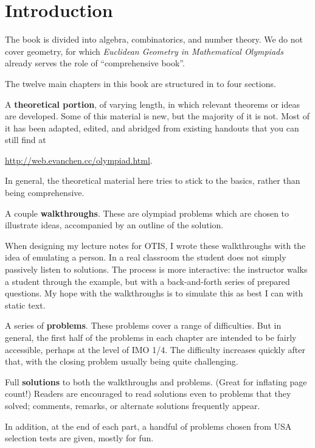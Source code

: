 \chapter{Introduction}
The book is divided into algebra, combinatorics, and number theory.
We do not cover geometry, for which
\emph{Euclidean Geometry in Mathematical Olympiads}
\cite{ref:EGMO} already serves the role of ``comprehensive book''.

The twelve main chapters in this book are structured in to four sections.
\begin{itemize}
	\ii A \textbf{theoretical portion}, of varying length,
	in which relevant theorems or ideas are developed.
	Some of this material is new, but the majority of it is not.
	Most of it has been adapted, edited, and abridged
	from existing handouts that you can still find at
	\begin{center}
		\url{http://web.evanchen.cc/olympiad.html}.
	\end{center}
	In general, the theoretical material here
	tries to stick to the basics, rather than being comprehensive.

	\ii A couple \textbf{walkthroughs}.
	These are olympiad problems
	which are chosen to illustrate ideas,
	accompanied by an outline of the solution.

	When designing my lecture notes for OTIS,
	I wrote these walkthroughs with the idea of emulating a person.
	In a real classroom the student does not simply passively listen to solutions.
	The process is more interactive:
	the instructor walks a student through the example,
	but with a back-and-forth series of prepared questions.
	My hope with the walkthroughs is to simulate
	this as best I can with static text.

	\ii A series of \textbf{problems}.
	These problems cover a range of difficulties.
	But in general, the first half of the problems in each chapter
	are intended to be fairly accessible,
	perhaps at the level of IMO 1/4.
	The difficulty increases quickly after that,
	with the closing problem usually being quite challenging.

	\ii Full \textbf{solutions} to both
	the walkthroughs and problems.
	(Great for inflating page count!)
	Readers are encouraged to read solutions even to problems
	that they solved; comments, remarks, or alternate solutions
	frequently appear.
\end{itemize}
In addition, at the end of each part,
a handful of problems chosen from USA selection tests are given,
mostly for fun.

